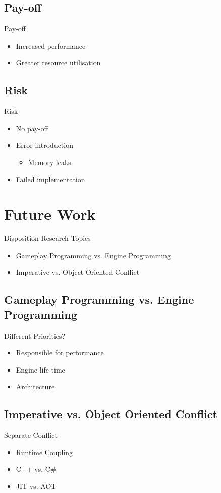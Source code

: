 \subsection{Pay-off}
\begin{frame}{\secname}{\subsecname}
	Pay-off
	\begin{itemize}
		\item<2-> Increased performance
		\item<3-> Greater resource utilisation
	\end{itemize}
\end{frame}

\subsection{Risk}
\begin{frame}{\secname}{\subsecname}
	Risk
	\begin{itemize}
		\item<2-> No pay-off
		\item<3-> Error introduction
		\begin{itemize}
			\item<4-> Memory leaks
		\end{itemize}
		\item<5-> Failed implementation
	\end{itemize}
\end{frame}

\section{Future Work}
\begin{frame}{\secname}{Disposition}
	Research Topics
	\begin{itemize}
		\item Gameplay Programming vs. Engine Programming
		\item Imperative vs. Object Oriented Conflict
	\end{itemize}
\end{frame}

\subsection{Gameplay Programming vs. Engine Programming}
\begin{frame}{\secname}{\subsecname}
	Different Priorities?
	\begin{itemize}
		\item<2-> Responsible for performance
		\item<3-> Engine life time
		\item<4-> Architecture
	\end{itemize}
\end{frame}

\subsection{Imperative vs. Object Oriented Conflict}
\begin{frame}{\secname}{\subsecname}
	Separate Conflict
	\begin{itemize}
		\item<2-> Runtime Coupling
		\item<3-> C++ vs. C#
		\item<4-> JIT vs. AOT
	\end{itemize}
\end{frame}

